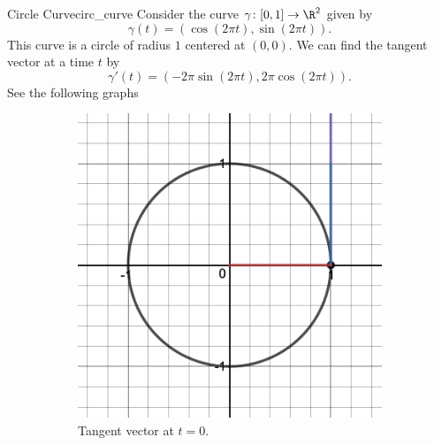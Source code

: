         \begin{ex}{Circle Curve}{circ_curve}
        Consider the curve $\gamma \colon [0,1] \to \R^2$ given by
        \[
        \gamma(t)=(\cos (2\pi t),\sin (2\pi t)).
        \]
        This curve is a circle of radius $1$ centered at $(0,0)$.  We can find the tangent vector at a time $t$ by
        \[
        \gamma'(t)=(-2\pi \sin(2\pi t), 2\pi \cos(2\pi t)).
        \]
        See the following graphs
        
    \begin{figure}[H]
    \centering
    \begin{subfigure}[h]{0.45\textwidth}
        \includegraphics[width=\textwidth]{Figures/circ_tang_1.png}
        \caption{Tangent vector at $t=0$.}
    \end{subfigure}
    ~ 
    \begin{subfigure}[h]{0.45\textwidth}

\end{subfigure}
\end{figure}
\end{ex}
